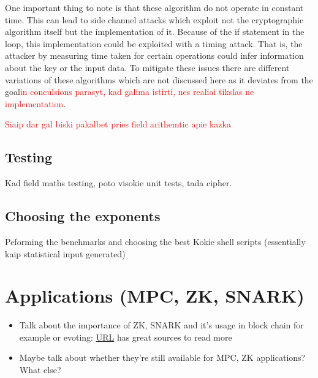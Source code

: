 \documentclass{Resources/UoBLab1}
\theoremstyle{definition}
\begin{document}
One important thing to note is that these algorithm do not operate in constant time. This can lead to side channel attacks which exploit not the cryptographic algorithm itself but the implementation of it. Because of the if statement in the loop, this implementation could be exploited with a timing attack. That is, the attacker by measuring time taken for certain operations could infer information about the key or the input data. To mitigate these issues there are different variations of these algorithms which are not discussed here as it deviates from the goal\textcolor{red}{in conculsions parasyt, kad galima istirti, nes realiai tikslas ne implementation}.

\textcolor{red}{Siaip dar gal biski pakalbet pries field arithemtic apie kazka}

\subsection{Testing}
Kad field maths testing, poto visokie unit tests, tada cipher.

\subsection{Choosing the exponents}
Peforming the benchmarks and choosing the best
Kokie shell scripts (essentially kaip statistical input generated) %




\section{Applications (MPC, ZK, SNARK)}
\begin{itemize}
    \item Talk about the importance of ZK, SNARK and it's usage in block chain for example or evoting: \href{https://ethereum.org/en/zero-knowledge-proofs/}{URL} has great sources to read more
    \item Maybe talk about whether they're still available for MPC, ZK applications? What else?
\end{itemize}
\end{document}
